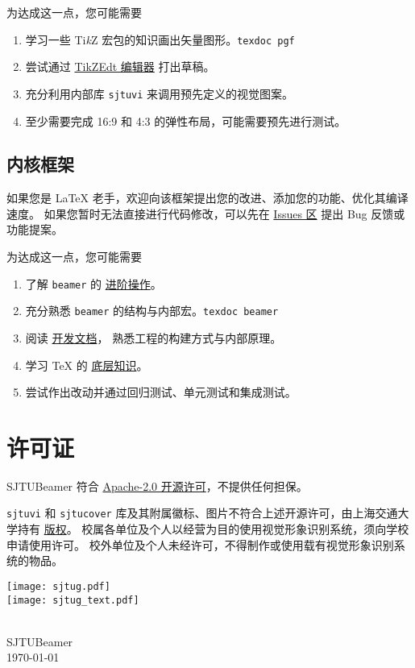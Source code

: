\documentclass[
    UTF8,
    heading=true,
    12pt,
    a4paper
]{ctexrep}
\def\themename{\textsf{SJTUBeamer}}
\def\sjtuglogo{
  \parbox{4cm}{
    \centering
    \texttt{[image: sjtug.pdf]}\\
    \vspace*{5pt}
    \texttt{[image: sjtug\_text.pdf]}
  }
}
\begin{document}
为达成这一点，您可能需要
\begin{enumerate}
  \item 学习一些 Ti\textit{k}Z
        宏包的知识画出矢量图形。\texttt{texdoc pgf}
  \item 尝试通过
        \href{https://code.google.com/archive/p/tikzedt/downloads}{TikZEdt 编辑器} 打出草稿。
  \item 充分利用内部库 \texttt{sjtuvi} 来调用预先定义的视觉图案。
  \item 至少需要完成 16:9 和 4:3 的弹性布局，可能需要预先进行测试。
\end{enumerate}

\section{内核框架}

如果您是 \LaTeX{} 老手，欢迎向该框架提出您的改进、添加您的功能、优化其编译速度。
如果您暂时无法直接进行代码修改，可以先在
\href{https://github.com/sjtug/SJTUBeamer/issues}{Issues 区}
提出 Bug 反馈或功能提案。

为达成这一点，您可能需要
\begin{enumerate}
  \item 了解 \texttt{beamer}
        的 \href{https://latex-beamer.com/}{进阶操作}。
  \item 充分熟悉 \texttt{beamer}
        的结构与内部宏。\texttt{texdoc beamer}
  \item 阅读
        \href{run:sjtubeamerdevguide.pdf}{开发文档}，
        熟悉工程的构建方式与内部原理。
  \item 学习 \TeX{} 的
        \href{https://mirrors.sjtug.sjtu.edu.cn/CTAN/graphics/pgf/contrib/pgfplots/doc/TeX-programming-notes.pdf}{底层知识}。
  \item 尝试作出改动并通过回归测试、单元测试和集成测试。
\end{enumerate}

\chapter*{许可证}

\themename{} 符合
\href{https://github.com/sjtug/SJTUBeamer/blob/main/LICENSE}{Apache-2.0 开源许可}，不提供任何担保。

\texttt{sjtuvi} 和 \texttt{sjtucover}
库及其附属徽标、图片不符合上述开源许可，由上海交通大学持有
\href{https://vi.sjtu.edu.cn/index.php/articles/bulletin/16}{版权}。
校属各单位及个人以经营为目的使用视觉形象识别系统，须向学校申请使用许可。
校外单位及个人未经许可，不得制作或使用载有视觉形象识别系统的物品。

\vfill
{
\centering
\sjtuglogo\\
{\large \themename{}\\}
\today\\
}
\vfill
\end{document}
